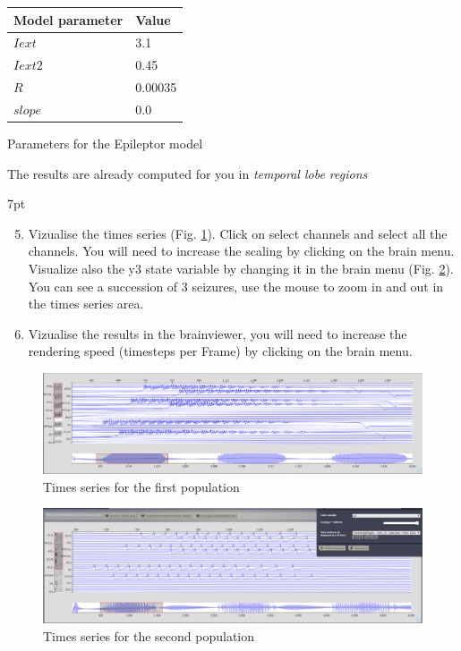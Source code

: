 \documentclass{tufte-handout}
\newenvironment{simulation}{%
  \def\FrameCommand{%
    \hspace{1pt}%
    {\color{ForestGreen}\vrule width 2pt}%
    {\color{simulationshade}\vrule width 4pt}%
    \colorbox{simulationshade}%
  }%
  \MakeFramed{\advance\hsize-\width\FrameRestore}%
  \noindent\hspace{-4.55pt}%
  \begin{adjustwidth}{}{7pt}%
  \vspace{2pt}\vspace{2pt}%
}
{%
  \vspace{2pt}\end{adjustwidth}\endMakeFramed%
}
\begin{document}
\begin{margintable}
  \centering
  \selectfont
  \begin{tabular}{ll}
    \toprule
    Model parameter & Value \\
    \midrule
             $Iext$          &   3.1  \\
             $Iext2$          &  0.45   \\
             $R$           &   0.00035        \\
             $slope$           &   0.0   \\
    \bottomrule
  \end{tabular}
  \caption{Parameters for the Epileptor model	 }
  \label{tab:modeltab}
\end{margintable}

The results are already computed for you in \textit{temporal lobe regions}

\begin{simulation}
  \begin{enumerate}
  \setcounter{enumi}{4}
  \item Vizualise the times series (Fig. \ref{fig:first_pop}). Click on select channels and select all the channels. 
	You will need to increase the scaling by clicking on the brain menu. Visualize also the y3 state variable by 
	changing it in the brain menu (Fig. \ref{fig:second_pop}). You can see a succession of 3 seizures, use the mouse
	 to zoom in and out in the times series area.
  \item Vizualise the results in the brainviewer, you will need to increase the rendering speed 
	(timesteps per Frame) by clicking on the brain menu.
\end{enumerate}
\end{simulation}
  
\begin{figure}[h]
  \includegraphics[width=\linewidth]{Handout_UI_ModellingAnEpilepticPatient_FirstPopulationTimesSeries}%
  \caption{Times series for the first population}%
  \label{fig:first_pop}%
\end{figure}

\begin{figure}[h]
  \includegraphics[width=\linewidth]{Handout_UI_ModellingAnEpilepticPatient_SecondPopulationTimesSeries}%
  \caption{Times series for the second population}%
  \label{fig:second_pop}%
\end{figure}
\end{document}
